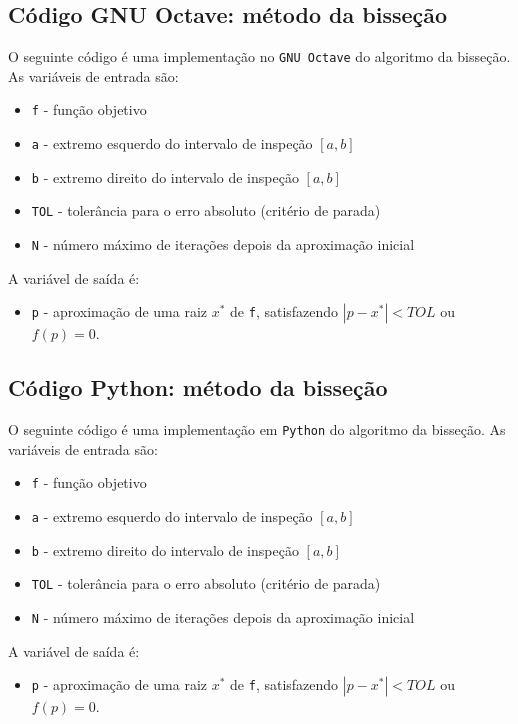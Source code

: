 
\fi
\ifisoctave
\subsection{Código GNU Octave: método da bisseção}\label{subsec:codigo_bissecao}

O seguinte código é uma implementação no \verb+GNU Octave+ do algoritmo da bisseção. As variáveis de entrada são:
\begin{itemize}
\item \verb+f+ - função objetivo
\item \verb+a+ - extremo esquerdo do intervalo de inspeção $[a, b]$
\item \verb+b+ - extremo direito do intervalo de inspeção $[a, b]$
\item \verb+TOL+ - tolerância para o erro absoluto (critério de parada)
\item \verb+N+ - número máximo de iterações depois da aproximação inicial
\end{itemize}
A variável de saída é:
\begin{itemize}
\item \verb+p+ - aproximação de uma raiz $x^*$ de \verb+f+, satisfazendo $|p - x^*|< TOL$ ou $f(p) = 0$.
\end{itemize}


\fi
\ifispython
\subsection{Código Python: método da bisseção}\label{subsec:codigo_bissecao}

O seguinte código é uma implementação em \verb+Python+ do algoritmo da bisseção. As variáveis de entrada são:
\begin{itemize}
\item \verb+f+ - função objetivo
\item \verb+a+ - extremo esquerdo do intervalo de inspeção $[a, b]$
\item \verb+b+ - extremo direito do intervalo de inspeção $[a, b]$
\item \verb+TOL+ - tolerância para o erro absoluto (critério de parada)
\item \verb+N+ - número máximo de iterações depois da aproximação inicial
\end{itemize}
A variável de saída é:
\begin{itemize}
\item \verb+p+ - aproximação de uma raiz $x^*$ de \verb+f+, satisfazendo $|p - x^*|< TOL$ ou $f(p) = 0$.
\end{itemize}

